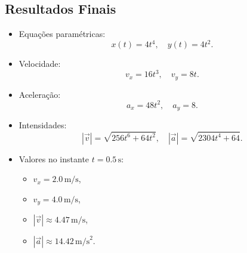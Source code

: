 \subsection*{Resultados Finais}
\begin{itemize}
    \item Equações paramétricas:
    \[
    x(t) = 4t^4, \quad y(t) = 4t^2.
    \]
    \item Velocidade:
    \[
    v_x = 16t^3, \quad v_y = 8t.
    \]
    \item Aceleração:
    \[
    a_x = 48t^2, \quad a_y = 8.
    \]
    \item Intensidades:
    \[
    |\vec{v}| = \sqrt{256t^6 + 64t^2}, \quad |\vec{a}| = \sqrt{2304t^4 + 64}.
    \]
    \item Valores no instante \(t = 0.5 \, \text{s}\):
    \begin{itemize}
        \item \(v_x = 2.0 \, \text{m/s}\),
        \item \(v_y = 4.0 \, \text{m/s}\),
        \item \(|\vec{v}| \approx 4.47 \, \text{m/s}\),
        \item \(|\vec{a}| \approx 14.42 \, \text{m/s}^2\).
    \end{itemize}
\end{itemize}

